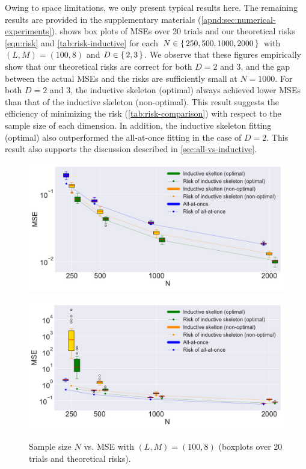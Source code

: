 \documentclass{article}
\begin{document}
Owing to space limitations, we only present typical results here. The remaining results are provided in the supplementary materials (\cref{apnd:sec:numerical-experiments}).
 shows box plots of MSEs over 20 trials and our theoretical risks \cref{eqn:risk} and \cref{tab:risk-inductive} for each $N \in \set{250, 500, 1000, 2000}$ with $(L, M) = (100, 8)$ and $D \in \set{2, 3}$.
We observe that these figures empirically show that our theoretical risks are correct for both $D = 2$ and 3, and the gap between the actual MSEs and the risks are sufficiently small at $N = 1000$. 
For both $D = 2$ and 3, the inductive skeleton (optimal) always achieved lower MSEs than that of the inductive skeleton (non-optimal). 
This result suggests the efficiency of minimizing the risk (\cref{tab:risk-comparison}) with respect to the sample size of each dimension. 
In addition, the inductive skeleton fitting (optimal) also outperformed the all-at-once fitting in the case of $D = 2$. 
This result also supports the discussion described in \cref{sec:all-vs-inductive}. 
\begin{figure}[h]
 \begin{minipage}{0.49\hsize}
        \centering
    \includegraphics[width=1\textwidth]{neurips2019/fig/D=2_M=8_L=100.pdf}
    \label{fig:MSE-vs-N-D=2}
 \end{minipage}
 \begin{minipage}{0.49\hsize}
        \centering
    \includegraphics[width=1\textwidth]{neurips2019/fig/D=3_M=8_L=100.pdf}
    \label{fig:MSE-vs-N-D=3}
 \end{minipage}
 \caption{Sample size $N$ vs. MSE with $(L, M) = (100, 8)$ (boxplots over 20 trials and theoretical risks).}
 \label{fig:MSE-vs-N}
\end{figure}
\end{document}
